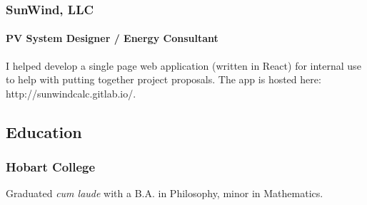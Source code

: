 \documentclass{article}
\begin{document}
\subsubsection{SunWind, LLC}

\paragraph{PV System Designer / Energy
Consultant}

I helped develop a single page web application (written in React) for
internal use to help with putting together project proposals. The app is
hosted here: http://sunwindcalc.gitlab.io/.

\subsection{Education}

\subsubsection{Hobart College}

Graduated \emph{cum laude} with a B.A. in Philosophy, minor in
Mathematics.
\end{document}
